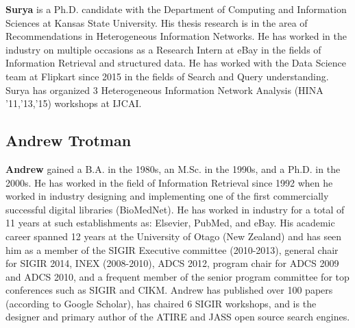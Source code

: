 \documentclass{acmart}
\begin{document}
\textbf{Surya} is a Ph.D. candidate with the Department of Computing and
Information Sciences at Kansas State University. His thesis research is
in the area of Recommendations in Heterogeneous Information Networks. He
has worked in the industry on multiple occasions as a Research Intern at
eBay in the fields of Information Retrieval and structured data. He has
worked with the Data Science team at Flipkart since 2015 in the fields
of Search and Query understanding. Surya has organized 3 Heterogeneous
Information Network Analysis (HINA '11,'13,'15) workshops at IJCAI.

\subsection*{Andrew Trotman}

\textbf{Andrew} gained a B.A. in the 1980s, an M.Sc. in the 1990s, and a Ph.D. in
the 2000s.  He has worked in the field of Information Retrieval since 1992
when he worked in industry designing and implementing one of the first
commercially successful digital libraries (BioMedNet).  He has worked in
industry for a total of 11 years at such establishments as: Elsevier,
PubMed, and eBay.  His academic career spanned 12 years at
the University of Otago (New Zealand) and has seen him as a member of the SIGIR Executive committee (2010-2013),
general chair for SIGIR 2014, INEX (2008-2010), ADCS 2012, program chair for ADCS 2009
and ADCS 2010, and a frequent member of the senior program committee for
top conferences such as SIGIR and CIKM.  Andrew has published over 100
papers (according to Google Scholar), has chaired 6 SIGIR workshops, and
is the designer and primary author of the ATIRE and JASS open source search engines.
\end{document}
